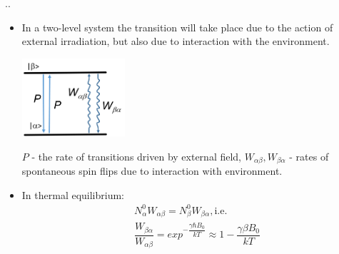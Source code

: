 \documentclass{beamer}
\begin{document}
\begin{frame}{\thesection.\thesubsection. \insertsubsection}
	\begin{itemize}[<+>]
	\item In a two-level system the transition will take place due to the action of external irradiation, but also due to interaction with the environment.
	\begin{minipage}{1.0\textwidth}
		\centering\includegraphics[width=0.3\textwidth]{two_level_population.png}
	\end{minipage}
	$P$ - the rate of transitions driven by external field, $W_{\alpha \beta}, W_{\beta \alpha}$ - rates of spontaneous spin flips due to interaction with environment.
	\item
	In thermal equilibrium:
	\begin{align}
		&N_{\alpha}^0 W_{\alpha \beta} = N_{\beta}^0 W_{\beta \alpha}, \text{i.e.} \\
		&\dfrac{ W_{\beta   \alpha }}{ W_{\alpha  \beta  }} = exp^{-\dfrac{\gamma \hbar B_0}{kT}} \approx 1-\dfrac{\gamma \beta B_0}{kT}
	\end{align}
	\end{itemize}
\end{frame}
\end{document}
